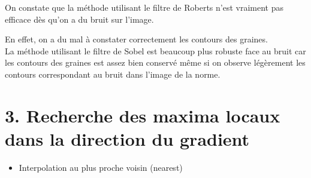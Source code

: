 \documentclass{article}
\begin{document}
On constate que la méthode utilisant le filtre de Roberts n'est vraiment pas efficace dès qu'on a du bruit sur l'image.

En effet, on a du mal à constater correctement les contours des graines.\\

La méthode utilisant le filtre de Sobel est beaucoup plus robuste face au bruit car les contours des graines est assez bien conservé même si on observe légèrement les contours correspondant au bruit dans l'image de la norme.

\section*{3. Recherche des maxima locaux dans la direction du gradient}

\begin{itemize}\renewcommand{\labelitemi}{$\bullet$}
	\item Interpolation au plus proche voisin (nearest)
	
	

\end{itemize}
\end{document}
